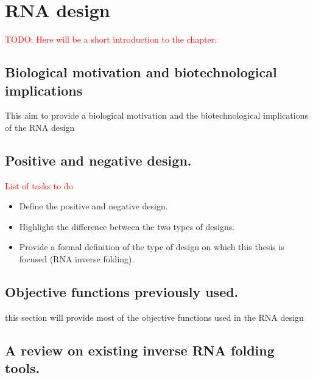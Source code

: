 \chapter{RNA design}\label{ch:mathtest} %
\textcolor{red}{TODO: Here will be a short introduction to the chapter.}

\section{Biological motivation and biotechnological implications}
This aim to provide a biological motivation and the biotechnological implications of the RNA design  

\section{Positive and negative design.}
\textcolor{red}{List of tasks to do}
\begin{itemize}
	\item Define the positive and negative design. 
	\item Highlight the difference between the two types of designs.  
	\item Provide a formal definition of the type of design on which this thesis is focused (RNA inverse folding). 
\end{itemize}


\section{Objective functions previously used.}
this section will provide most of the objective functions used in the RNA design

\section{A review on existing inverse RNA folding tools.}

